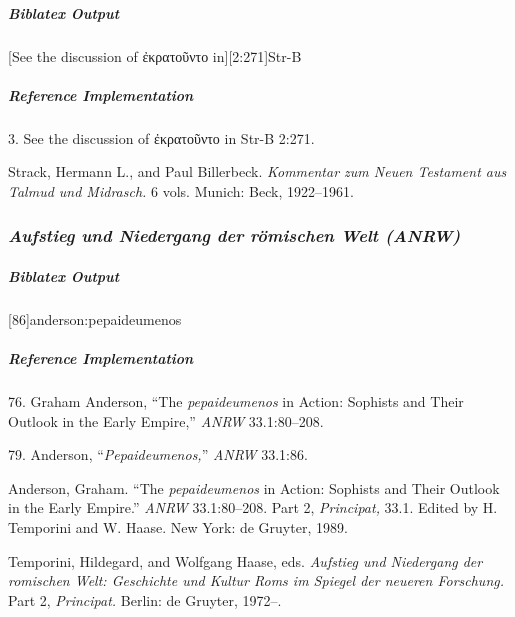 \documentclass[a4paper]{article}
\newcommand{\textgreek}[1]{{\greekfont #1}}
\newenvironment{biboutput}{%
  \subparagraph{Biblatex Output}
}{\color{black}}
\newenvironment{refimp}{%
  \subparagraph{Reference Implementation}
  \color{reference-colour}
  \rm
}{\par\color{black}}
\begin{document}
\begin{biboutput}
  [See the discussion of \textgreek{ἐκρατοῦντο} in][2:271]{Str-B}
\end{biboutput}

\begin{refimp}
  \hspace*{\bibindent}3. See the discussion of \textgreek{ἐκρατοῦντο} in Str-B
  2:271.

  \hangindent\bibindent Strack, Hermann L., and Paul Billerbeck.
  \emph{Kommentar zum Neuen Testament aus Talmud und Midrasch.} 6 vols.
  Munich: Beck, 1922–1961.

  \sloppy{}
\end{refimp}

\subsubsection{\emph{Aufstieg und Niedergang der römischen Welt (ANRW)}}

\begin{biboutput}
  [86]{anderson:pepaideumenos}
\end{biboutput}

\begin{refimp}
  \hspace*{\bibindent}76. Graham Anderson, “The \emph{pepaideumenos} in
  Action: Sophists and Their Outlook in the Early Empire,” \emph{ANRW}
  33.1:80–208.

  \hspace*{\bibindent}79. Anderson, “\emph{Pepaideumenos,}” \emph{ANRW}
  33.1:86.

  \hangindent\bibindent Anderson, Graham. “The \emph{pepaideumenos} in Action:
  Sophists and Their Outlook in the Early Empire.” \emph{ANRW} 33.1:80–208.
  Part 2, \emph{Principat,} 33.1. Edited by H. Temporini and W. Haase. New
  York: de Gruyter, 1989.

  \hangindent\bibindent Temporini, Hildegard, and Wolfgang Haase, eds.
  \emph{Aufstieg und Niedergang der romischen Welt: Geschichte und Kultur Roms
  im Spiegel der neueren Forschung.} Part 2, \emph{Principat.} Berlin: de
  Gruyter, 1972–.

\end{refimp}
\end{document}
